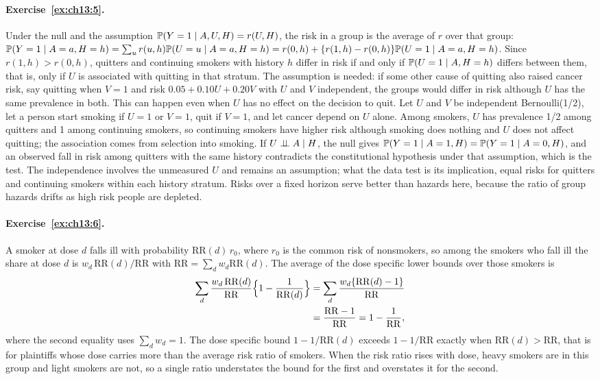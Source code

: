 \paragraph{Exercise~\ref{ex:ch13:5}.} Under the null and the assumption $\mathbb{P}(Y = 1 \mid A, U, H) = r(U, H)$, the risk in a group is the average of $r$ over that group: $\mathbb{P}(Y = 1 \mid A = a, H = h) = \sum_u r(u, h)\mathbb{P}(U = u \mid A = a, H = h) = r(0, h) + \{r(1, h) - r(0, h)\}\mathbb{P}(U = 1 \mid A = a, H = h)$. Since $r(1, h) > r(0, h)$, quitters and continuing smokers with history $h$ differ in risk if and only if $\mathbb{P}(U = 1 \mid A, H = h)$ differs between them, that is, only if $U$ is associated with quitting in that stratum. The assumption is needed: if some other cause of quitting also raised cancer risk, say quitting when $V = 1$ and risk $0.05 + 0.10U + 0.20V$ with $U$ and $V$ independent, the groups would differ in risk although $U$ has the same prevalence in both. This can happen even when $U$ has no effect on the decision to quit. Let $U$ and $V$ be independent Bernoulli(1/2), let a person start smoking if $U = 1$ or $V = 1$, quit if $V = 1$, and let cancer depend on $U$ alone. Among smokers, $U$ has prevalence 1/2 among quitters and 1 among continuing smokers, so continuing smokers have higher risk although smoking does nothing and $U$ does not affect quitting; the association comes from selection into smoking. If $U \perp\!\!\!\perp A \mid H$, the null gives $\mathbb{P}(Y = 1 \mid A = 1, H) = \mathbb{P}(Y = 1 \mid A = 0, H)$, and an observed fall in risk among quitters with the same history contradicts the constitutional hypothesis under that assumption, which is the test. The independence involves the unmeasured $U$ and remains an assumption; what the data test is its implication, equal risks for quitters and continuing smokers within each history stratum. Risks over a fixed horizon serve better than hazards here, because the ratio of group hazards drifts as high risk people are depleted.

\paragraph{Exercise~\ref{ex:ch13:6}.} A smoker at dose $d$ falls ill with probability $\mathrm{RR}(d)\,r_0$, where $r_0$ is the common risk of nonsmokers, so among the smokers who fall ill the share at dose $d$ is $w_d\,\mathrm{RR}(d)/\mathrm{RR}$ with $\mathrm{RR} = \sum_d w_d \mathrm{RR}(d)$. The average of the dose specific lower bounds over those smokers is
\begin{align*}
\sum_d \frac{w_d\,\mathrm{RR}(d)}{\mathrm{RR}}\Bigl\{1 - \frac{1}{\mathrm{RR}(d)}\Bigr\} &= \sum_d \frac{w_d\{\mathrm{RR}(d) - 1\}}{\mathrm{RR}} \\
&= \frac{\mathrm{RR} - 1}{\mathrm{RR}} = 1 - \frac{1}{\mathrm{RR}},
\end{align*}
where the second equality uses $\sum_d w_d = 1$. The dose specific bound $1 - 1/\mathrm{RR}(d)$ exceeds $1 - 1/\mathrm{RR}$ exactly when $\mathrm{RR}(d) > \mathrm{RR}$, that is for plaintiffs whose dose carries more than the average risk ratio of smokers. When the risk ratio rises with dose, heavy smokers are in this group and light smokers are not, so a single ratio understates the bound for the first and overstates it for the second.

